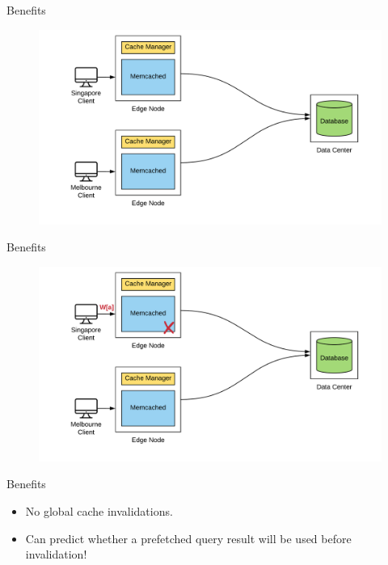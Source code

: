 \documentclass[10pt]{beamer}
\begin{document}
\begin{frame}{Benefits}
    \begin{figure}
        \center
        \hspace*{-1.5cm}
        \includegraphics[scale=0.17]{apollo_ec_dbl}
    \end{figure}
\end{frame}

\begin{frame}{Benefits}
    \begin{figure}
        \center
        \hspace*{-1.5cm}
        \includegraphics[scale=0.17]{apollo_ec_upd}
    \end{figure}
\end{frame}

\begin{frame}[fragile]{Benefits}
    \begin{itemize}
        \item{No global cache invalidations.}
        \item{Can predict whether a prefetched query result will be used before invalidation!}
    \end{itemize}
\end{frame}
\end{document}
